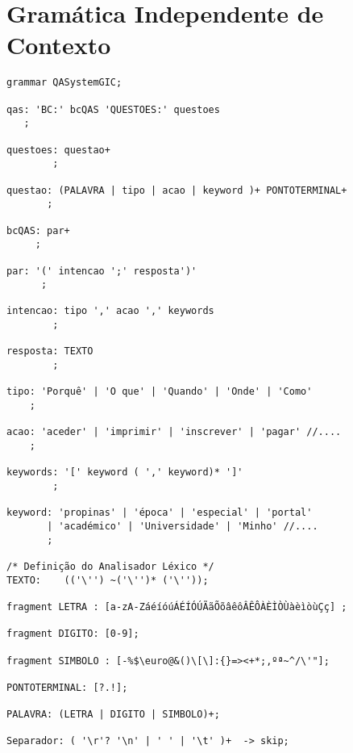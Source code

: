 
\section{Gramática Independente de Contexto} \label{GIC}
\begin{verbatim}
grammar QASystemGIC;

qas: 'BC:' bcQAS 'QUESTOES:' questoes
   ;

questoes: questao+
        ;

questao: (PALAVRA | tipo | acao | keyword )+ PONTOTERMINAL+
       ;

bcQAS: par+
     ;

par: '(' intencao ';' resposta')'  
      ;

intencao: tipo ',' acao ',' keywords
        ;

resposta: TEXTO
        ;

tipo: 'Porquê' | 'O que' | 'Quando' | 'Onde' | 'Como'
    ;

acao: 'aceder' | 'imprimir' | 'inscrever' | 'pagar' //....
    ;

keywords: '[' keyword ( ',' keyword)* ']'
        ;

keyword: 'propinas' | 'época' | 'especial' | 'portal' 
       | 'académico' | 'Universidade' | 'Minho' //....
       ;

/* Definição do Analisador Léxico */         
TEXTO:    (('\'') ~('\'')* ('\''));

fragment LETRA : [a-zA-ZáéíóúÁÉÍÓÚÃãÕõâêôÂÊÔÀÈÌÒÙàèìòùÇç] ;

fragment DIGITO: [0-9];

fragment SIMBOLO : [-%$\euro@&()\[\]:{}=><+*;,ºª~^/\'"];

PONTOTERMINAL: [?.!];

PALAVRA: (LETRA | DIGITO | SIMBOLO)+;

Separador: ( '\r'? '\n' | ' ' | '\t' )+  -> skip; 
\end{verbatim}

